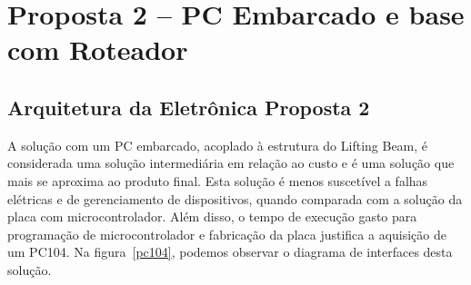 


\section{Proposta 2 – PC Embarcado e base com Roteador}

\subsection{Arquitetura da Eletrônica Proposta 2}
A solução com um PC embarcado, acoplado à estrutura do Lifting Beam, é
considerada uma solução intermediária em relação ao custo e é uma solução que
mais se aproxima ao produto final. Esta solução é menos suscetível a falhas
elétricas e de gerenciamento de dispositivos, quando comparada com a solução da
placa com microcontrolador. Além disso, o tempo de execução gasto para programação de microcontrolador e fabricação da placa justifica a aquisição de um PC104. Na figura~\ref{pc104}, podemos observar o diagrama de interfaces desta solução.

